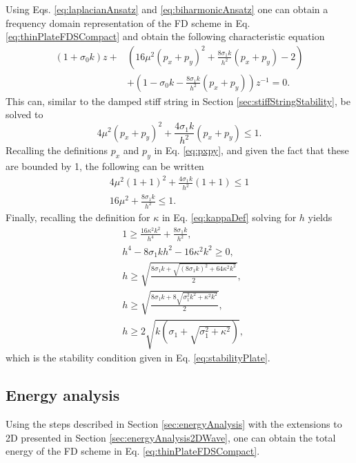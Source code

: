 {Using Eqs. \eqref{eq:laplacianAnsatz} and \eqref{eq:biharmonicAnsatz} one can obtain a frequency domain representation of the FD scheme in Eq. \eqref{eq:thinPlateFDSCompact}
and obtain the following characteristic equation
\begin{equation}
    \begin{aligned}
        (1+\sigma_0k)z + &\left(16\mu^2(p_x+p_y)^2 + \frac{8\sigma_1k}{h^2}(p_x+p_y) - 2\right) \\
        &+ \left(1 - \sigma_0k - \frac{8\sigma_1k}{h^2}(p_x+p_y)\right)z^{-1} = 0.
    \end{aligned}
\end{equation}
This can, similar to the damped stiff string in Section \ref{sec:stiffStringStability}, be solved to
\begin{equation*}
    4\mu^2(p_x+p_y)^2 + \frac{4\sigma_1k}{h^2}(p_x+p_y) \leq 1.
\end{equation*}
Recalling the definitions $p_x$ and $p_y$ in Eq. \eqref{eq:pxpy}, and given the fact that these are bounded by 1, the following can be written
\begin{gather*}
    4\mu^2(1+1)^2 + \frac{4\sigma_1k}{h^2}(1+1) \leq 1\\
    16\mu^2 + \frac{8\sigma_1k}{h^2} \leq 1.
\end{gather*}
Finally, recalling the definition for $\kappa$ in Eq. \eqref{eq:kappaDef} solving for $h$ yields
\begin{align}
    &1 \geq \frac{16\kappa^2k^2}{h^4} + \frac{8\sigma_1k}{h^2}\nonumber,\\
    &h^4 - 8\sigma_1kh^2 - 16\kappa^2k^2 \geq 0\nonumber,\\
    &h \geq \sqrt{\frac{8\sigma_1k +\sqrt{(8\sigma_1k)^2 + 64\kappa^2k^2}}{2}}\nonumber,\\
    &h\geq \sqrt{\frac{8\sigma_1k+8\sqrt{\sigma_1^2k^2+\kappa^2k^2}}{2}}\nonumber,\\
    &h \geq 2\sqrt{k\left(\sigma_1 + \sqrt{\sigma_1^2 + \kappa^2}\right)},
\end{align}
which is the stability condition given in Eq. \eqref{eq:stabilityPlate}.

\subsection{Energy analysis}\label{sec:energyAnalysisThinPlate}
Using the steps described in Section \ref{sec:energyAnalysis} with the extensions to 2D presented in Section \ref{sec:energyAnalysis2DWave}, one can obtain the total energy of the FD scheme in Eq. \eqref{eq:thinPlateFDSCompact}.
}
